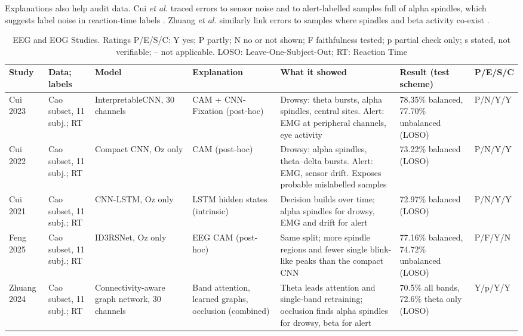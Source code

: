 Explanations also help audit data. Cui \textit{et al.} traced errors to sensor noise and to alert-labelled samples full of alpha spindles, which suggests label noise in reaction-time labels \cite{cui2022eeg,cui2022compact}. Zhuang \textit{et al.} similarly link errors to samples where spindles and beta activity co-exist \cite{zhuang2024connectivity}.

\begin{table}[!t]
\centering
\caption{EEG and EOG Studies. Ratings P/E/S/C: Y yes; P partly; N no or not shown; F faithfulness tested; p partial check only; s stated, not verifiable; -- not applicable. LOSO: Leave-One-Subject-Out; RT: Reaction Time}
\label{tab:eeg}
\scriptsize
\setlength{\tabcolsep}{3pt}
\begin{tabularx}{\textwidth}{@{}L{1.5cm}L{2.7cm}L{2.3cm}L{2.2cm}YL{3.1cm}L{0.95cm}@{}}
\toprule
\textbf{Study} & \textbf{Data; labels} & \textbf{Model} & \textbf{Explanation} & \textbf{What it showed} & \textbf{Result (test scheme)} & \textbf{P/E/S/C} \\
\midrule
Cui 2023 \cite{cui2022eeg} & Cao subset, 11 subj.; RT & InterpretableCNN, 30 channels & CAM + CNN-Fixation (post-hoc) & Drowsy: theta bursts, alpha spindles, central sites. Alert: EMG at peripheral channels, eye activity & 78.35\% balanced, 77.70\% unbalanced (LOSO) & P/N/Y/Y \\
Cui 2022 \cite{cui2022compact} & Cao subset, 11 subj.; RT & Compact CNN, Oz only & CAM (post-hoc) & Drowsy: alpha spindles, theta--delta bursts. Alert: EMG, sensor drift. Exposes probable mislabelled samples & 73.22\% balanced (LOSO) & P/N/Y/Y \\
Cui 2021 \cite{cui2021subject} & Cao subset, 11 subj.; RT & CNN-LSTM, Oz only & LSTM hidden states (intrinsic) & Decision builds over time; alpha spindles for drowsy, EMG and drift for alert & 72.97\% balanced (LOSO) & P/N/Y/Y \\
Feng 2025 \cite{feng2025id3rsnet} & Cao subset, 11 subj.; RT & ID3RSNet, Oz only & EEG CAM (post-hoc) & Same split; more spindle regions and fewer single blink-like peaks than the compact CNN & 77.16\% balanced, 74.72\% unbalanced (LOSO) & P/F/Y/N \\
Zhuang 2024 \cite{zhuang2024connectivity} & Cao subset, 11 subj.; RT & Connectivity-aware graph network, 30 channels & Band attention, learned graphs, occlusion (combined) & Theta leads attention and single-band retraining; occlusion finds alpha spindles for drowsy, beta for alert & 70.5\% all bands, 72.6\% theta only (LOSO) & Y/p/Y/Y \\

\end{tabularx}
\end{table}
